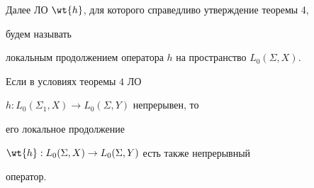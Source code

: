 Далее ЛО $\wt{h}$, для которого справедливо утверждение теоремы 4,


будем называть


локальным продолжением оператора $h$ на пространство $L_0(\Sigma,X)$.





\begin{thm}


Если в условиях теоремы $4$ ЛО


$h:L_0(\Sigma_1,X)\to L_0(\Sigma,Y)$ непрерывен, то


его локальное продолжение


$\wt{h}:L_0(\Sigma,X)\to L_0(\Sigma,Y)$ есть также непрерывный


оператор.


\end{thm}





